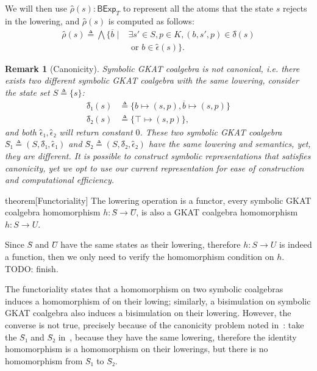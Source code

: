 \documentclass[conference]{IEEEtran}
\newtheorem{remark}[definition]{Remark}
\newcommand{\theoryOf}[1]{\ensuremath{\mathsf{#1}}}
\newcommand{\BExp}{\theoryOf{BExp}}
\begin{document}
We will then use \(ρ̂(s): \BExp_T\) to represent all the atoms that the state \(s\) rejects in the lowering, and \(ρ̂(s)\) is computed as follows:
\begin{align*}
    ρ̂(s) ≜ ⋀ \{\overline{b} ∣{}
        & ∃ s' ∈ S, p ∈ K, (b, s', p) ∈ δ̂(s) \\
        & \text{ or } b ∈ ϵ̂(s)\}.
\end{align*}

\begin{remark}[Canonicity]\label{rem:canonicity}
    Symbolic GKAT coalgebra is not canonical, i.e. there exists two different symbolic GKAT coalgebra with the same lowering, consider the state set \(S ≜ \{s\}\):
    \begin{align*}
        {δ̂}₁(s) & ≜ \{b ↦ (s, p), \overline{b} ↦ (s, p)\} \\
        {δ̂}₂(s) & ≜ \{⊤ ↦ (s, p)\},
    \end{align*} 
    and both \(ϵ̂₁, ϵ̂₂\) will return constant \(0\).
    These two symbolic GKAT coalgebra \(Ŝ₁ ≜ (S, δ̂₁, ϵ̂₁)\) and \(Ŝ₂ ≜ (S, δ̂₂, ϵ̂₂)\) have the same lowering and semantics, yet, they are different.
    It is possible to construct symbolic representations that satisfies canonicity, yet we opt to use our current representation for ease of construction and computational efficiency.
\end{remark}

\begin{theoremEnd}{theorem}[Functoriality]\label{thm:lowering-functor}
    The lowering operation is a functor, every symbolic GKAT coalgebra homomorphism \(h: Ŝ → Û\), is also a GKAT coalgebra homomorphism \(h: S → U\).
\end{theoremEnd}

\begin{proofEnd}
    Since \(Ŝ\) and \(Û\) have the same states as their lowering, therefore \(h: S → U\) is indeed a function, then we only need to verify the homomorphism condition on \(h\).
    TODO: finish.
\end{proofEnd}

The functoriality states that a homomorphism on two symbolic coalgebras induces a homomorphism of on their lowing; similarly, a bisimulation on symbolic GKAT coalgebra also induces a bisimulation on their lowering.
However, the converse is not true, precisely because of the canonicity problem noted in~: take the \(Ŝ₁\) and \(Ŝ₂\) in~, because they have the same lowering, therefore the identity homomorphism is a homomorphism on their lowerings, but there is no homomorphism from \(Ŝ₁\) to \(Ŝ₂\).
\end{document}
